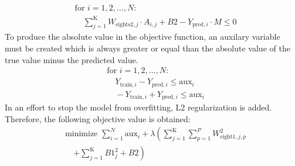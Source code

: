 \begin{align*}
    &\text{for } i = 1, 2, \ldots, N: \\
    &\quad \sum_{j=1}^{\text{K}} W_{\text{eights2}, j} \cdot A_{i, j} + B2 - Y_{\text{pred}, i} \cdot M \leq 0
\end{align*}
To produce the absolute value in the objective function, an auxilary variable must be created which is always greater or equal than the absolute value of the true value minus the predicted value.
\begin{align*}
    &\text{for } i = 1, 2, \ldots, N: \\
    &\quad Y_{\text{train}, i} - Y_{\text{pred}, i} \leq \text{aux}_i \\
    &\quad -Y_{\text{train}, i} + Y_{\text{pred}, i} \leq \text{aux}_i
\end{align*}
In an effort to stop the model from overfitting, L2 regularization is added. Therefore, the following objective value is obtained:
\begin{align*}
    &\text{minimize } \sum_{i=1}^{N} \text{aux}_i + \lambda \left( \sum_{j=1}^{\text{K}} \sum_{p=1}^{P} W_{\text{eight1}, j, p}^2 \right. \\
    &\quad \left. + \sum_{j=1}^{\text{K}} B1_j^2 + B2 \right)
\end{align*}
